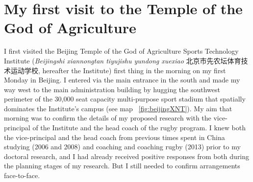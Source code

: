 
\section{My first visit to the Temple of the God of Agriculture}
I first visited the Beijing Temple of the God of Agriculture Sports Technology Institute (\textit{Beijingshi xiannongtan tiyujishu yundong xuexiao} 北京市先农坛体育技术运动学校,
hereafter the Institute) first thing in the morning on my first Monday in Beijing.  I entered via the main entrance in the south and made my way west to the main administration building by hugging the southwest perimeter of the 30,000 seat capacity multi-purpose sport stadium that spatially dominates the Institute's campus (see map ~\ref{fig:beijingXNT}). My aim that morning was to confirm the details of my proposed research with the vice-principal of the Institute and the head coach of the rugby program. I knew both the vice-principal and the head coach from previous times spent in China studying (2006 and 2008) and coaching and coaching rugby (2013) prior to my doctoral research, and I had already received positive responses from both during the planning stages of my research.  But I still needed to confirm arrangements face-to-face.

